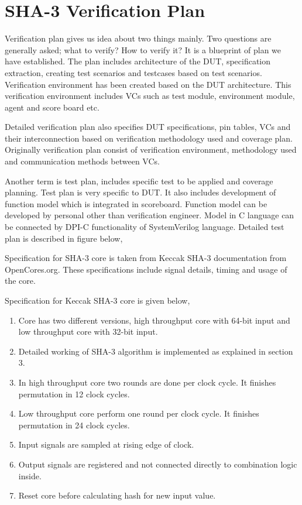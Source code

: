 \chapter{SHA-3 Verification Plan}

Verification plan gives us idea about two things mainly. Two questions are generally asked; what to verify? How to verify it?  It is a blueprint of plan we have established. The plan includes architecture of the DUT, specification extraction, creating test scenarios and testcases based on test scenarios. Verification environment has been created based on the DUT architecture. This verification environment includes VCs such as test module, environment module, agent and score board etc. \par

Detailed verification plan also specifies DUT specifications, pin tables, VCs and their interconnection based on verification methodology used and coverage plan. Originally verification plan consist of verification environment, methodology used and communication methods between VCs. \par

Another term is test plan, includes specific test to be applied and coverage planning. Test plan is very specific to DUT. It also includes development of function model which is integrated in scoreboard. Function model can be developed by personal other than verification engineer. Model in C language can be connected by DPI-C functionality of SystemVerilog language. Detailed test plan is described in figure below,




Specification for SHA-3 core is taken from Keccak SHA-3 documentation from OpenCores.org. These specifications include signal details, timing and usage of the core. \par


Specification for Keccak SHA-3 core is given below,

\begin{enumerate}
\item Core has two different versions, high throughput core with 64-bit input and low throughput core with 32-bit input.
\item Detailed working of SHA-3 algorithm is implemented as explained in section 3.
\item In high throughput core two rounds are done per clock cycle. It finishes permutation in 12 clock cycles.
\item Low throughput core perform one round per clock cycle. It finishes permutation in 24 clock cycles.
\item Input signals are sampled at rising edge of clock.
\item Output signals are registered and not connected directly to combination logic inside.
\item Reset core before calculating hash for new input value.

\end{enumerate}

